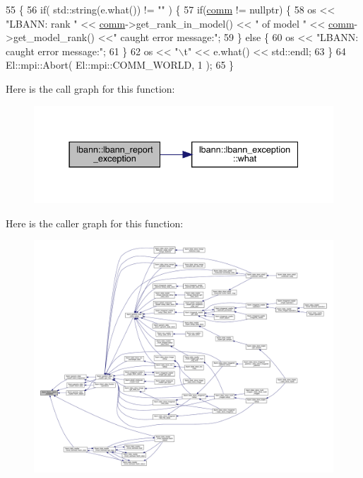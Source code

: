 \begin{DoxyCode}
55                                                                                                           \{
56   \textcolor{keywordflow}{if}( std::string(e.what()) != \textcolor{stringliteral}{""} ) \{
57     \textcolor{keywordflow}{if}(\hyperlink{file__io_8cpp_ab048c6f9fcbcfaa57ce68b00263dbebe}{comm} != \textcolor{keyword}{nullptr}) \{
58       os << \textcolor{stringliteral}{"LBANN: rank "} << \hyperlink{file__io_8cpp_ab048c6f9fcbcfaa57ce68b00263dbebe}{comm}->get\_rank\_in\_model() << \textcolor{stringliteral}{" of model "} << 
      \hyperlink{file__io_8cpp_ab048c6f9fcbcfaa57ce68b00263dbebe}{comm}->get\_model\_rank() <<\textcolor{stringliteral}{" caught error message:"};
59     \} \textcolor{keywordflow}{else} \{
60       os << \textcolor{stringliteral}{"LBANN: caught error message:"};
61     \}
62     os << \textcolor{stringliteral}{"\(\backslash\)t"} << e.what() << std::endl;
63   \}
64   El::mpi::Abort( El::mpi::COMM\_WORLD, 1 );
65 \}
\end{DoxyCode}
Here is the call graph for this function\+:\nopagebreak
\begin{figure}[H]
\begin{center}
\leavevmode
\includegraphics[width=337pt]{namespacelbann_aedccb3bf2d674ccb5573ab9960720731_cgraph}
\end{center}
\end{figure}
Here is the caller graph for this function\+:\nopagebreak
\begin{figure}[H]
\begin{center}
\leavevmode
\includegraphics[width=350pt]{namespacelbann_aedccb3bf2d674ccb5573ab9960720731_icgraph}
\end{center}
\end{figure}
\mbox{\label{namespacelbann_a9c2447a7dfde8f6fb73c5f12f20046f9}} 
